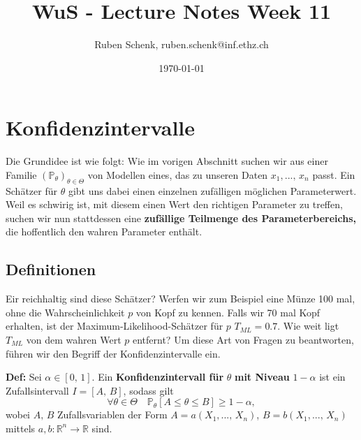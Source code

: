 \documentclass[a4paper]{extarticle}
\title{WuS - Lecture Notes Week 11}
\author{Ruben Schenk, ruben.schenk@inf.ethz.ch}
\date{\today}
\begin{document}
\maketitle

\section{Konfidenzintervalle}

Die Grundidee ist wie folgt: Wie im vorigen Abschnitt suchen wir aus einer Familie $(\mathbb{P}_{\theta})_{\theta \in \Theta}$ von Modellen eines, das zu unseren Daten $x_1,..., \, x_n$ passt. Ein Schätzer für $\theta$ gibt uns dabei einen einzelnen zufälligen möglichen Parameterwert. Weil es schwirig ist, mit diesem einen Wert den richtigen Parameter zu treffen, suchen wir nun stattdessen eine \textbf{zufällige Teilmenge des Parameterbereichs,} die hoffentlich den wahren Parameter enthält.

\subsection{Definitionen}

Eir reichhaltig sind diese Schätzer? Werfen wir zum Beispiel eine Münze 100 mal, ohne die Wahrscheinlichkeit $p$ von Kopf zu kennen. Falls wir 70 mal Kopf erhalten, ist der Maximum-Likelihood-Schätzer für $p$ $T_{ML} = 0.7$. Wie weit ligt $T_{ML}$ von dem wahren Wert $p$ entfernt? Um diese Art von Fragen zu beantworten, führen wir den Begriff der Konfidenzintervalle ein.

\textbf{Def:} Sei $\alpha \in [0, \, 1]$. Ein \textbf{Konfidenzintervall für} $\theta$ \textbf{mit Niveau} $1 - \alpha$ ist ein Zufallsintervall $I = [A, \, B]$, sodass gilt
\[
    \forall \theta \in \Theta \quad \mathbb{P}_{\theta}[A \leq \theta \leq B] \geq 1 - \alpha,
\]
wobei $A, \, B$ Zufallsvariablen der Form $A = a(X_1,..., \, X_n)$, $B = b(X_1,..., \, X_n)$ mittels $a,b : \mathbb{R}^n \to \mathbb{R}$ sind.
\end{document}

